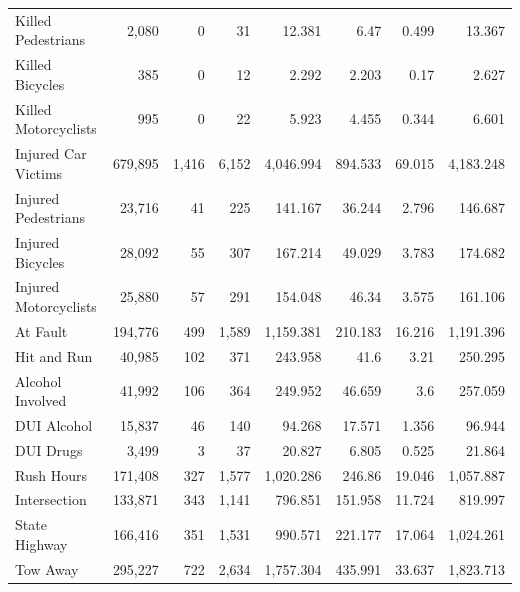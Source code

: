 \begin{table}[h!]
\begin{tabular}{lrrrrrrr}
Killed Pedestrians & 2,080 & 0 & 31 & 12.381 & 6.47 & 0.499 & 13.367 \\
Killed Bicycles & 385 & 0 & 12 & 2.292 & 2.203 & 0.17 & 2.627 \\
Killed Motorcyclists & 995 & 0 & 22 & 5.923 & 4.455 & 0.344 & 6.601 \\
Injured Car Victims & 679,895 & 1,416 & 6,152 & 4,046.994 & 894.533 & 69.015 & 4,183.248 \\
Injured Pedestrians & 23,716 & 41 & 225 & 141.167 & 36.244 & 2.796 & 146.687 \\
Injured Bicycles & 28,092 & 55 & 307 & 167.214 & 49.029 & 3.783 & 174.682 \\
Injured Motorcyclists & 25,880 & 57 & 291 & 154.048 & 46.34 & 3.575 & 161.106 \\
\midrule
At Fault & 194,776 & 499 & 1,589 & 1,159.381 & 210.183 & 16.216 & 1,191.396 \\
Hit and Run & 40,985 & 102 & 371 & 243.958 & 41.6 & 3.21 & 250.295 \\
Alcohol Involved & 41,992 & 106 & 364 & 249.952 & 46.659 & 3.6 & 257.059 \\
DUI Alcohol & 15,837 & 46 & 140 & 94.268 & 17.571 & 1.356 & 96.944 \\
DUI Drugs & 3,499 & 3 & 37 & 20.827 & 6.805 & 0.525 & 21.864 \\
\midrule
Rush Hours & 171,408 & 327 & 1,577 & 1,020.286 & 246.86 & 19.046 & 1,057.887 \\
Intersection & 133,871 & 343 & 1,141 & 796.851 & 151.958 & 11.724 & 819.997 \\
State Highway & 166,416 & 351 & 1,531 & 990.571 & 221.177 & 17.064 & 1,024.261 \\
Tow Away & 295,227 & 722 & 2,634 & 1,757.304 & 435.991 & 33.637 & 1,823.713 \\
\bottomrule
\end{tabular}
\end{table}